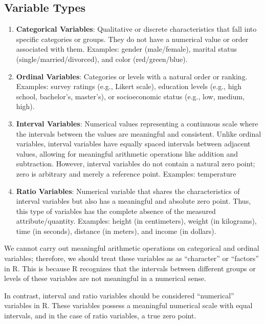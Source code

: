 \documentclass[
]{book}
\begin{document}
\hypertarget{variable-types}{%
\subsection{Variable Types}\label{variable-types}}

\begin{enumerate}
\def\labelenumi{\arabic{enumi}.}
\item
  \textbf{Categorical Variables}: Qualitative or discrete characteristics that fall into specific categories or groups. They do not have a numerical value or order associated with them. Examples: gender (male/female), marital status (single/married/divorced), and color (red/green/blue).
\item
  \textbf{Ordinal Variables}: Categories or levels with a natural order or ranking. Examples: survey ratings (e.g., Likert scale), education levels (e.g., high school, bachelor's, master's), or socioeconomic status (e.g., low, medium, high).
\item
  \textbf{Interval Variables}: Numerical values representing a continuous scale where the intervals between the values are meaningful and consistent. Unlike ordinal variables, interval variables have equally spaced intervals between adjacent values, allowing for meaningful arithmetic operations like addition and subtraction. However, interval variables do not contain a natural zero point; zero is arbitrary and merely a reference point. Examples: temperature
\item
  \textbf{Ratio Variables}: Numerical variable that shares the characteristics of interval variables but also has a meaningful and absolute zero point. Thus, this type of variables has the complete absence of the measured attribute/quantity. Examples: height (in centimeters), weight (in kilograms), time (in seconds), distance (in meters), and income (in dollars).
\end{enumerate}

We cannot carry out meaningful arithmetic operations on categorical and ordinal variables; therefore, we should treat these variables as as ``character'' or ``factors'' in R. This is because R recognizes that the intervals between different groups or levels of these variables are not meaningful in a numerical sense.

In contrast, interval and ratio variables should be considered ``numerical'' variables in R. These variables possess a meaningful numerical scale with equal intervals, and in the case of ratio variables, a true zero point.
\end{document}
